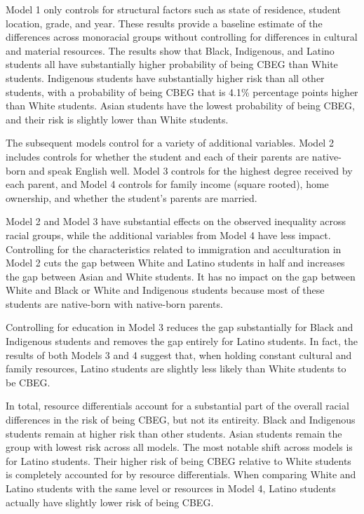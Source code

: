 \documentclass[
  12pt,
  letterpaper,
]{article}
\begin{document}
Model 1 only controls for structural factors such as state of residence,
student location, grade, and year. These results provide a baseline
estimate of the differences across monoracial groups without controlling
for differences in cultural and material resources. The results show
that Black, Indigenous, and Latino students all have substantially
higher probability of being CBEG than White students. Indigenous
students have substantially higher risk than all other students, with a
probability of being CBEG that is 4.1\% percentage points higher than
White students. Asian students have the lowest probability of being
CBEG, and their risk is slightly lower than White students.

The subsequent models control for a variety of additional variables.
Model 2 includes controls for whether the student and each of their
parents are native-born and speak English well. Model 3 controls for the
highest degree received by each parent, and Model 4 controls for family
income (square rooted), home ownership, and whether the student's
parents are married.

Model 2 and Model 3 have substantial effects on the observed inequality
across racial groups, while the additional variables from Model 4 have
less impact. Controlling for the characteristics related to immigration
and acculturation in Model 2 cuts the gap between White and Latino
students in half and increases the gap between Asian and White students.
It has no impact on the gap between White and Black or White and
Indigenous students because most of these students are native-born with
native-born parents.

Controlling for education in Model 3 reduces the gap substantially for
Black and Indigenous students and removes the gap entirely for Latino
students. In fact, the results of both Models 3 and 4 suggest that, when
holding constant cultural and family resources, Latino students are
slightly less likely than White students to be CBEG.

In total, resource differentials account for a substantial part of the
overall racial differences in the risk of being CBEG, but not its
entireity. Black and Indigenous students remain at higher risk than
other students. Asian students remain the group with lowest risk across
all models. The most notable shift across models is for Latino students.
Their higher risk of being CBEG relative to White students is completely
accounted for by resource differentials. When comparing White and Latino
students with the same level or resources in Model 4, Latino students
actually have slightly lower risk of being CBEG.
\end{document}
